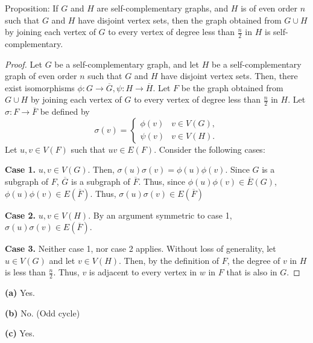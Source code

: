 \documentclass[12pt]{article}
\begin{document}
\newpage{} Proposition: If $G$ and $H$ are self-complementary graphs, and $H$ is of even order $n$ such that $G$ and $H$ have disjoint vertex sets, then the graph obtained from $G \cup H$ by joining each vertex of $G$ to every vertex of degree less than $\frac n2$ in $H$ is self-complementary.
\begin{proof}
    Let $G$ be a self-complementary graph, and let $H$ be a self-complementary graph of even order $n$ such that $G$ and $H$ have disjoint vertex sets.
    Then, there exist isomorphisms $\phi: G \to \overline G, \psi: H \to \overline H$.
    Let $F$ be the graph obtained from $G \cup H$ by joining each vertex of $G$ to every vertex of degree less than $\frac n2$ in $H$.
    Let $\sigma: F \to \overline F$ be defined by $$\sigma(v) = \begin{cases} \phi(v) & v \in V(G), \\ \psi(v) & v \in V(H). \end{cases}$$
    Let $u,v \in V(F)$ such that $uv \in E(F)$. Consider the following cases:
    
    {\bf Case 1.} $u,v \in V(G)$.
    Then, $\sigma(u)\sigma(v) = \phi(u)\phi(v)$.
    Since $G$ is a subgraph of $F$, $\overline G$ is a subgraph of $\overline F$.
    Thus, since $\phi(u)\phi(v) \in \overline E(G)$, $\phi(u)\phi(v) \in E(\overline F)$.
    Thus, $\sigma(u)\sigma(v) \in E(\overline F)$

    {\bf Case 2.} $u,v \in V(H)$.
    By an argument symmetric to case 1, $\sigma(u)\sigma(v) \in E(\overline F)$.

    {\bf Case 3.} Neither case 1, nor case 2 applies.
    Without loss of generality, let $u \in V(G)$ and let $v \in V(H)$.
    Then, by the definition of $F$, the degree of $v$ in $H$ is less than $\frac n2$.
    Thus, $v$ is adjacent to every vertex in $w$ in $F$ that is also in $G$.
\end{proof}
\newpage{}

\newpage{}

{\bf (a)} Yes.

{\bf (b)} No. (Odd cycle)

{\bf (c)} Yes.
\end{document}
